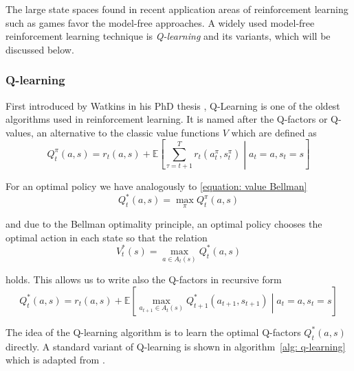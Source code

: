 \documentclass[a4paper,12pt]{article}
\newcommand{\E}{\mathbb{E}}
\begin{document}
The large state spaces found in recent application areas of reinforcement learning such as games \cite{mnih2013playing} favor the model-free approaches. A widely used model-free reinforcement learning technique is \emph{Q-learning} and its variants, which will be discussed below.


\subsubsection{Q-learning}

First introduced by Watkins in his PhD thesis \cite{watkins1989learning}, Q-Learning is one of the oldest algorithms used in reinforcement learning. It is named after the Q-factors or Q-values, an alternative to the classic value functions $V$ which are defined as
\begin{equation}
    Q^\pi_t(a, s) = r_t(a, s) + \E \left[ \sum_{\tau = t+1}^T r_t( a^\pi_t, s^\pi_t) \middle| a_t = a, s_t = s \right] 
    \label{equation: Q-values 1}
\end{equation}

For an optimal policy we have analogously to \eqref{equation: value Bellman}
\begin{equation}
    Q^*_t(a, s) = \max_\pi Q^\pi_t(a, s)
\end{equation}

and due to the Bellman optimality principle, an optimal policy chooses the optimal action in each state so that the relation
\begin{equation}
    V^*_t(s) = \max_{a\in A_t(s)} Q^*_t(a, s)
    \label{equation: relation from Q to V}
\end{equation}

holds. This allows us to write also the Q-factors in recursive form
\begin{equation}
    Q^*_t(a, s) = r_t(a, s) + \E \left[ \max_{a_{t+1}\in A_t(s)} Q^*_{t+1}(a_{t+1}, s_{t+1}) \middle| a_t = a, s_t = s \right] 
    \label{equation: Q-values Bellman}
\end{equation}

The idea of the Q-learning algorithm is to learn the optimal Q-factors $Q^*_t(a, s)$ directly. 
A standard variant of Q-learning is shown in algorithm~\ref{alg: q-learning} which is adapted from \cite{powell2021reinforcement}.

\end{document}
